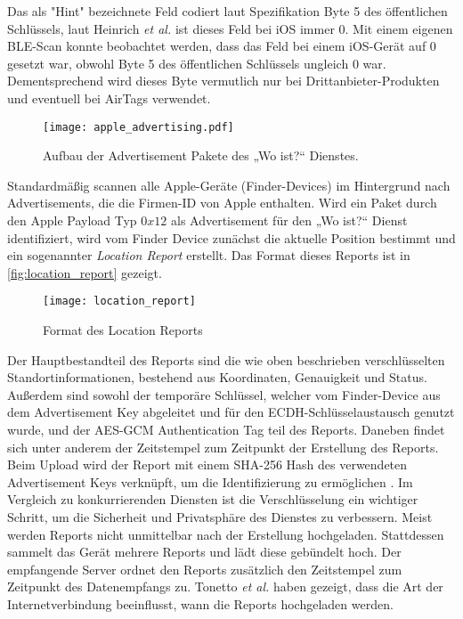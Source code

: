 Das als "Hint" bezeichnete Feld codiert laut Spezifikation \cite{Apple_FindMySpec} Byte 5 des öffentlichen Schlüssels, laut Heinrich \textit{et al.} \cite{Heinrich_FindMy} ist dieses Feld bei iOS immer 0.
Mit einem eigenen \ac{BLE}-Scan konnte beobachtet werden, dass das Feld bei einem iOS-Gerät auf 0 gesetzt war, obwohl Byte 5 des öffentlichen Schlüssels ungleich 0 war.
Dementsprechend wird dieses Byte vermutlich nur bei Drittanbieter-Produkten und eventuell bei AirTags verwendet.
\begin{figure}
    \centering
    \texttt{[image: apple\_advertising.pdf]}
    \caption{Aufbau der Advertisement Pakete des „Wo ist?“ Dienstes.}
    \label{fig:apple_advertising}
\end{figure}

Standardmäßig scannen alle Apple-Geräte (Finder-Devices) im Hintergrund nach Advertisements, die die Firmen-ID von Apple enthalten.
Wird ein Paket durch den Apple Payload Typ $0x12$ als Advertisement für den „Wo ist?“ Dienst identifiziert, wird vom Finder Device zunächst die aktuelle Position bestimmt und ein sogenannter \textit{Location Report} erstellt.
Das Format dieses Reports ist in \autoref{fig:location_report} gezeigt.
\begin{figure}
    \centering
    \texttt{[image: location\_report]}
    \caption{Format des Location Reports \cite{Heinrich_FindMy}}
    \label{fig:location_report}
\end{figure}
Der Hauptbestandteil des Reports sind die wie oben beschrieben verschlüsselten Standortinformationen, bestehend aus Koordinaten, Genauigkeit und Status.
Außerdem sind sowohl der temporäre Schlüssel, welcher vom Finder-Device aus dem Advertisement Key abgeleitet und für den \ac{ECDH}-Schlüsselaustausch genutzt wurde, und der \ac{AES}-\ac{GCM} Authentication Tag teil des Reports.
Daneben findet sich unter anderem der Zeitstempel zum Zeitpunkt der Erstellung des Reports.
Beim Upload wird der Report mit einem \ac{SHA}-256 Hash des verwendeten Advertisement Keys verknüpft, um die Identifizierung zu ermöglichen \cite{Heinrich_FindMy}.
Im Vergleich zu konkurrierenden Diensten ist die Verschlüsselung ein wichtiger Schritt, um die Sicherheit und Privatsphäre des Dienstes zu verbessern.
Meist werden Reports nicht unmittelbar nach der Erstellung hochgeladen.
Stattdessen sammelt das Gerät mehrere Reports und lädt diese gebündelt hoch.
Der empfangende Server ordnet den Reports zusätzlich den Zeitstempel zum Zeitpunkt des Datenempfangs zu.
Tonetto \textit{et al.} \cite{Tonetto_FindMy} haben gezeigt, dass die Art der Internetverbindung beeinflusst, wann die Reports hochgeladen werden.
